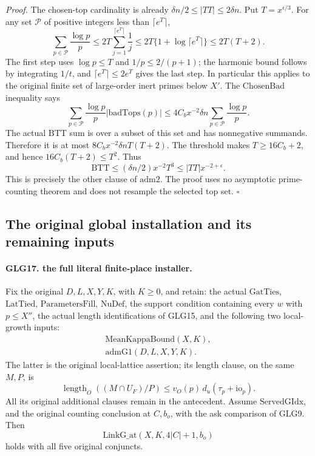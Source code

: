 \documentclass[11pt,a4paper]{article}
\numberwithin{equation}{section}
\theoremstyle{remark}\newtheorem{remark}[theorem]{Remark}
\begin{document}
\emph{Proof.}
The chosen-top cardinality is already
\(\delta n/2\le|TT|\le2\delta n\).
Put \(T=x^{\epsilon/3}\). For any set \(\mathcal P\)
of positive integers less than \(\lceil e^T\rceil\),
\[
 \sum_{p\in\mathcal P}\frac{\log p}{p}
 \le2T\sum_{j=1}^{\lceil e^T\rceil}\frac1j
 \le2T\{1+\log\lceil e^T\rceil\}\le2T(T+2).                       \tag{GLG.46}
\]
The first step uses \(\log p\le T\) and
\(1/p\le2/(p+1)\); the harmonic bound follows by
integrating \(1/t\), and
\(\lceil e^T\rceil\le2e^T\) gives the last step.
In particular this applies to the original finite set
of large-order inert primes below \(X'\).
The \(\mathrm{ChosenBad}\) inequality says
\[
 \sum_{p\in\mathcal P}\frac{\log p}{p}
                       |\mathrm{badTops}(p)|
    \le4C_bx^{-2}\delta n
                    \sum_{p\in\mathcal P}\frac{\log p}{p}.
 \]
The actual \(\mathrm{BTT}\) sum is over a subset of
this set and has nonnegative summands. Therefore it is
at most \(8C_bx^{-2}\delta nT(T+2)\).
The threshold makes \(T\ge16C_b+2\), and hence
\(16C_b(T+2)\le T^2\). Thus
\[
 \mathrm{BTT}\le(\delta n/2)x^{-2}T^3
                      \le |TT|x^{-2+\epsilon}.
 \]
This is precisely the other clause of \(\mathrm{adm2}\).
The proof uses no asymptotic prime-counting theorem and
does not resample the selected top set.
\hfill\(\square\)

\subsection{The original global installation and its remaining inputs}

\paragraph{GLG17. the full literal finite-place installer.}
\label{claim:GLG17}
Fix the original \(D,L,X,Y,K\), with \(K\ge0\), and retain:
the actual \(\mathrm{GatTies}\), \(\mathrm{LatTied}\),
\(\mathrm{ParametersFill}\), \(\mathrm{NuDef}\),
the support condition containing every \(w\) with \(p\le X''\),
the actual length identifications of GLG15, and the following
two local-growth inputs:
\[
 \begin{gathered}
 \mathrm{MeanKappaBound}(X,K),\\
 \mathrm{admG1}(D,L,X,Y,K).
 \end{gathered}                                                     \tag{GLG.47}
\]
The latter is the original local-lattice assertion; its
length clause, on the same \(M,P\), is
\[
 \operatorname{length}_O((M\cap U_F)/P)
       \le v_O(p)\,d_u(\tau_p+\mathrm{io}_p).                     \tag{GLG.48}
\]
All its original additional clauses remain in the antecedent.
Assume \(\mathrm{ServedGIdx}\), and the original counting
conclusion at \(C,b_o\), with the ask comparison of GLG9.
Then
\[
                    \mathrm{LinkG\_\allowbreak at}(X,K,4|C|+1,b_o)           \tag{GLG.49}
\]
holds with all five original conjuncts.
\end{document}
